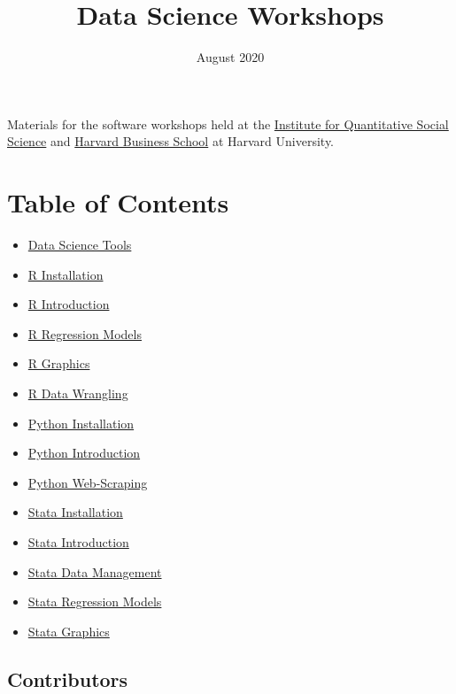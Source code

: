 \documentclass[
]{book}
\title{Data Science Workshops}
\author{}
\date{\vspace{-2.5em}August 2020}
\providecommand{\tightlist}{%
  \setlength{\itemsep}{0pt}\setlength{\parskip}{0pt}}
\begin{document}
\maketitle

{
\setcounter{tocdepth}{1}
\tableofcontents
}
Materials for the software workshops held at the \href{http://dss.iq.harvard.edu/}{Institute for Quantitative Social Science} and \href{https://training.rcs.hbs.org}{Harvard Business School} at Harvard University.

\hypertarget{table-of-contents}{%
\chapter*{Table of Contents}\label{table-of-contents}}

\begin{itemize}
\tightlist
\item
  \href{./DataScienceTools.html}{Data Science Tools}
\item
  \href{./Rinstall.html}{R Installation}
\item
  \href{./Rintro.html}{R Introduction}
\item
  \href{./Rmodels.html}{R Regression Models}
\item
  \href{./Rgraphics.html}{R Graphics}
\item
  \href{./RDataWrangling.html}{R Data Wrangling}
\item
  \href{./PythonInstall.html}{Python Installation}
\item
  \href{./PythonIntro.html}{Python Introduction}
\item
  \href{./PythonWebScrape.html}{Python Web-Scraping}
\item
  \href{./StataInstall.html}{Stata Installation}
\item
  \href{./StataIntro.html}{Stata Introduction}
\item
  \href{./StataDataManage.html}{Stata Data Management}
\item
  \href{./StataModels.html}{Stata Regression Models}
\item
  \href{./StataGraphics.html}{Stata Graphics}
\end{itemize}

\hypertarget{contributors}{%
\section*{Contributors}\label{contributors}}
\end{document}
